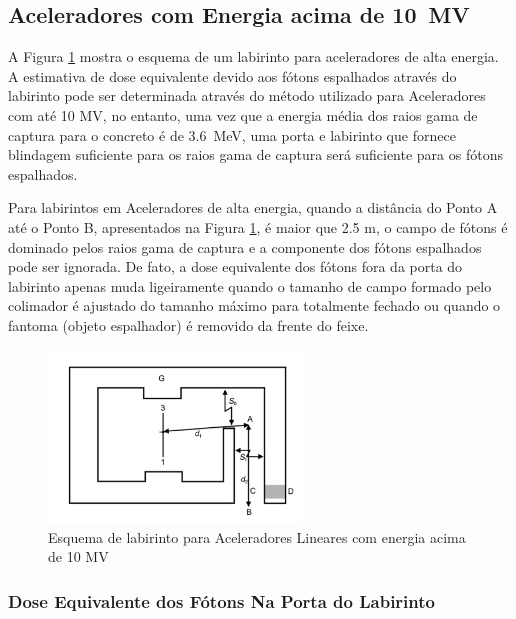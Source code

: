 \documentclass[11pt,a4paper]{article}
\begin{document}
        \subsection{Aceleradores com Energia acima de \qty{10}{MV}}
        

            A Figura \ref{fig:esquemaLabirintonêutrons} mostra o esquema de um labirinto para aceleradores de alta energia. A estimativa de dose equivalente devido aos fótons espalhados através do labirinto pode ser determinada através do método utilizado para Aceleradores com até 10 MV, no entanto, uma vez que a energia média dos raios gama de captura para o concreto é de \qty{3.6}{MeV}, uma porta e labirinto que fornece blindagem suficiente para os raios gama de captura será suficiente para os fótons espalhados.

            Para labirintos em Aceleradores de alta energia, quando a distância do Ponto A até o Ponto B, apresentados na Figura \ref{fig:esquemaLabirintonêutrons}, é maior que 2.5 m, o campo de fótons é dominado pelos raios gama de captura e a componente dos fótons espalhados pode ser ignorada. De fato, a dose equivalente dos fótons fora da porta do labirinto apenas muda ligeiramente quando o tamanho de campo formado pelo colimador é ajustado do tamanho máximo para totalmente fechado ou quando o fantoma (objeto espalhador) é removido da frente do feixe. 

             

            \begin{figure}[h]
                \centering
                \includegraphics[width=0.6\textwidth]{Imagens/esquemaLabirintoneutrons.jpg}
                \caption{Esquema de labirinto para Aceleradores Lineares com energia acima de 10 MV}
                \label{fig:esquemaLabirintonêutrons}
            \end{figure}

    \subsubsection{Dose Equivalente dos Fótons Na Porta do Labirinto}
\end{document}
